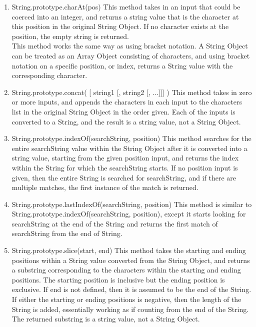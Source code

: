 \documentclass[a4paper,11pt,twoside]{report}
\begin{document}
\begin{enumerate}
\item String.prototype.charAt(pos) \newline
This method takes in an input that could be coerced into an integer, and returns a string value that is the character at this position in the original String Object. If no character exists at the position, the empty string is returned. \\
This method works the same way as using bracket notation. A String Object can be treated as an Array Object consisting of characters, and using bracket notation on a specific position, or index, returns a String value with the corresponding character.

\item String.prototype.concat( [ string1 [, string2 [, ...]]] ) \newline
This method takes in zero or more inputs, and appends the characters in each input to the characters list in the original String Object in the order given. Each of the inputs is converted to a String, and the result is a string value, not a String Object.

\item String.prototype.indexOf(searchString, position) \newline
This method searches for the entire searchString value within the String Object after it is converted into a string value, starting from the given position input, and returns the index within the String for which the searchString starts. If no position input is given, then the entire String is searched for searchString, and if there are multiple matches, the first instance of the match is returned. 

\item String.prototype.lastIndexOf(searchString, position) \newline
This method is similar to String.prototype.indexOf(searchString, position), except it starts looking for searchString at the end of the String and returns the first match of searchString from the end of String.

\item String.prototype.slice(start, end) \newline
This method takes the starting and ending positions within a String value converted from the String Object, and returns a substring corresponding to the characters within the starting and ending positions. The starting position is inclusive but the ending position is exclusive. If end is not defined, then it is assumed to be the end of the String. If either the starting or ending positions is negative, then the length of the String is added, essentially working as if counting from the end of the String. The returned substring is a string value, not a String Object.


\end{enumerate}
\end{document}
